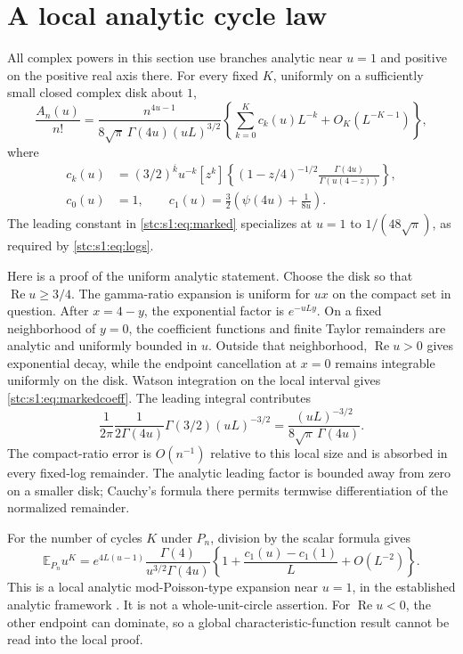 \documentclass[11pt,letterpaper]{article}
\numberwithin{equation}{section}
\theoremstyle{remark}\newtheorem{remark}[theorem]{Remark}
\newcommand{\E}{\mathbb E}
\newcommand{\rf}[2]{#1^{\overline{#2}}}
\newcommand{\coef}[2]{[#1^{#2}]}
\newcommand{\Ga}{\Gamma}
\DeclareMathOperator{\Rea}{Re}
\begin{document}
\section{A local analytic cycle law}\label{stc:s1:sec:cycle}
All complex powers in this section use branches analytic near $u=1$ and positive on the positive real axis there. For every fixed $K$, uniformly on a sufficiently small closed complex disk about $1$,
\begin{equation}\label{stc:s1:eq:marked}
 \frac{A_n(u)}{n!}=
 \frac{n^{4u-1}}{8\sqrt\pi\,\Ga(4u)(uL)^{3/2}}
 \left\{\sum_{k=0}^K c_k(u)L^{-k}+O_K(L^{-K-1})\right\},
\end{equation}
where
\begin{align}\label{stc:s1:eq:markedcoeff}
 c_k(u)&=\rf{(3/2)}{k}u^{-k}\coef{z}{k}
 \left\{(1-z/4)^{-1/2}\frac{\Ga(4u)}{\Ga(u(4-z))}\right\},\\
 c_0(u)&=1,\qquad c_1(u)=\frac32\left(\psi(4u)+\frac1{8u}\right).\nonumber
\end{align}
The leading constant in \eqref{stc:s1:eq:marked} specializes at $u=1$ to $1/(48\sqrt\pi)$, as required by \eqref{stc:s1:eq:logs}.

Here is a proof of the uniform analytic statement. Choose the disk so that $\Rea u\geq3/4$. The gamma-ratio expansion is uniform for $ux$ on the compact set in question. After $x=4-y$, the exponential factor is $e^{-uLy}$. On a fixed neighborhood of $y=0$, the coefficient functions and finite Taylor remainders are analytic and uniformly bounded in $u$. Outside that neighborhood, $\Rea u>0$ gives exponential decay, while the endpoint cancellation at $x=0$ remains integrable uniformly on the disk. Watson integration on the local interval gives \eqref{stc:s1:eq:markedcoeff}. The leading integral contributes
\[
 \frac1{2\pi}\frac1{2\Ga(4u)}\Ga(3/2)(uL)^{-3/2}
   =\frac{(uL)^{-3/2}}{8\sqrt\pi\,\Ga(4u)}.
\]
The compact-ratio error is $O(n^{-1})$ relative to this local size and is absorbed in every fixed-log remainder. The analytic leading factor is bounded away from zero on a smaller disk; Cauchy's formula there permits termwise differentiation of the normalized remainder.

For the number of cycles $K$ under $P_n$, division by the scalar formula gives
\begin{equation}\label{stc:s1:eq:pgf}
 \E_{P_n}u^K=e^{4L(u-1)}
 \frac{\Ga(4)}{u^{3/2}\Ga(4u)}
 \left\{1+\frac{c_1(u)-c_1(1)}L+O(L^{-2})\right\}.
\end{equation}
This is a local analytic mod-Poisson-type expansion near $u=1$, in the established analytic framework \cite{nz}. It is not a whole-unit-circle assertion. For $\Rea u<0$, the other endpoint can dominate, so a global characteristic-function result cannot be read into the local proof.
\end{document}
